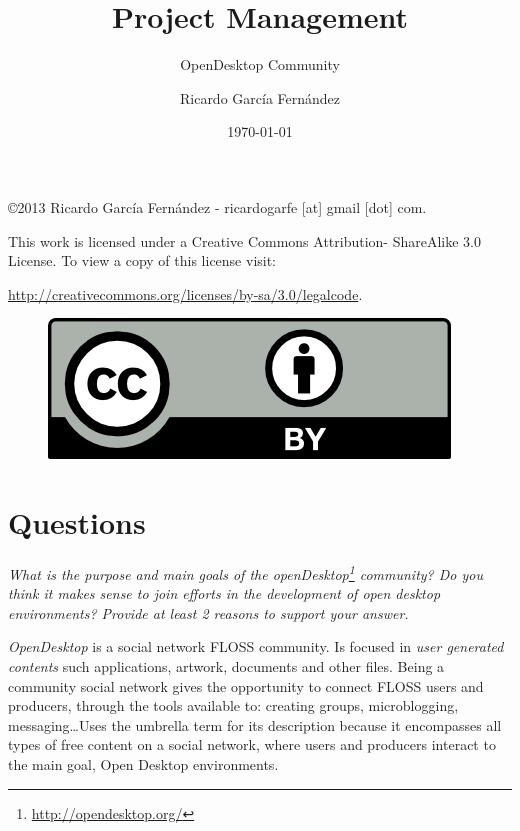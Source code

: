 \documentclass[11pt]{scrartcl}
\title{\textbf{Project Management}}
\subtitle{OpenDesktop Community}
\author{Ricardo Garc\'ia Fern\'andez}
\date{\today}
\begin{document}
\maketitle

\vfill

\begin{flushright}
    \copyright  2013 Ricardo Garc\'ia Fern\'andez - ricardogarfe [at] gmail [dot] com.

    This work is licensed under a Creative Commons Attribution- ShareAlike 3.0 License.
    To view a copy of this license visit:
 
    \url{http://creativecommons.org/licenses/by-sa/3.0/legalcode}.
\end{flushright}

\begin{figure}[h]
    \begin{flushright}	
        \includegraphics{by}
        \label{fig:by-sa}
    \end{flushright}
\end{figure}

\newpage

\section{Questions}

\emph{What is the purpose and main goals of the \emph{openDesktop}\footnote{\url{http://opendesktop.org/}} community? Do you think it makes sense to join efforts in the development of open desktop environments? Provide at least 2 reasons to support your answer.}

\par \emph{OpenDesktop} is a social network FLOSS community. Is focused in \emph{user generated contents} such applications, artwork, documents and other files. Being a community social network gives the opportunity to connect FLOSS users and producers, through the tools available to: creating groups, microblogging, messaging\ldots Uses the umbrella term for its description because it encompasses all types of free content on a social network, where users and producers interact to the main goal, Open Desktop environments.
\end{document}
